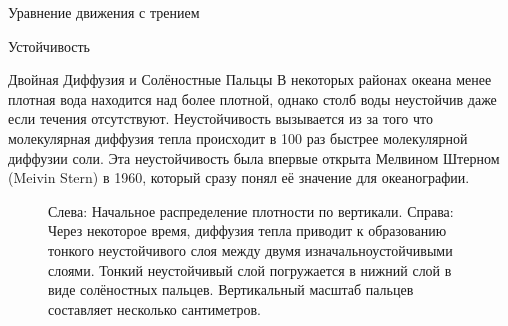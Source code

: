 \begin{chapter}{Уравнение движения с трением}
\begin{section}{Устойчивость}
\begin{paragraph}{Двойная Диффузия и Солёностные Пальцы}
В некоторых районах океана менее плотная вода находится над более
плотной, однако столб воды неустойчив даже если течения
отсутствуют. Неустойчивость вызывается из за того что молекулярная
диффузия тепла происходит в 100 раз быстрее молекулярной диффузии
соли. Эта неустойчивость была впервые открыта Мелвином Штерном (Meivin
Stern) в 1960, который сразу понял её значение для океанографии.
%

\begin{figure}[h!]
\caption{Слева: Начальное распределение плотности по
вертикали. Справа: Через некоторое время, диффузия тепла приводит к
образованию тонкого неустойчивого слоя между двумя
изначальноустойчивыми слоями. Тонкий неустойчивый слой погружается в
нижний слой в виде солёностных пальцев. Вертикальный масштаб пальцев
составляет несколько сантиметров.}
\label{fig:saltfingers}
\vspace{-2ex}
\end{figure}
%


\end{paragraph}
\end{section}
\end{chapter}
